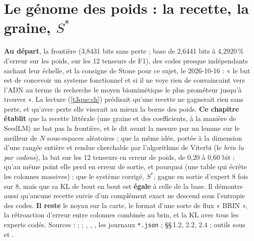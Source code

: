 \chapter{Le génome des poids : la recette, la graine, \texorpdfstring{$S^{*}$}{S*}}\label{t3gen:ch}

\begin{origine}
\textbf{Au départ}, la frontière (3,8431 bits sans perte ; base de 2,6441 bits à 4,2920\,\% d'erreur sur les poids, sur les 12 tenseurs de F1), des codes presque indépendants sachant leur échelle, et la consigne de Stone pour ce sujet, le 2026-10-16 : « le but est de concevoir un systeme fonctionnel et si il ne voye rien de convaincaint vers l'ADN au terme ils recherche le moyen biomimétique le plus prométeur jusqu'à trouver ». La lecture (\cref{t3que:ch}) prédisait qu'une recette ne gagnerait rien sans perte, et qu'avec perte elle viserait au mieux la borne des poids.
\textbf{Ce chapitre établit} que la recette littérale (une graine et des coefficients, à la manière de SeedLM) ne bat pas la frontière, et le dit avant la mesure par un lemme sur le meilleur de $N$ sous-espaces aléatoires ; que la même idée, portée à la dimension d'une rangée entière et rendue cherchable par l'algorithme de Viterbi (le \emph{brin lu par codons}), la bat sur les 12 tenseurs en erreur de poids, de 0,20 à 0,60 bit ; qu'au même point elle perd en erreur de sortie, et pourquoi (une table qui écrête les colonnes massives) ; que le système corrigé, $S^{*}$, gagne en sortie d'expert 8 fois sur 8, mais que sa KL de bout en bout est \textbf{égale} à celle de la base. Il démontre aussi qu'aucune recette suivie d'un complément exact ne descend sous l'entropie des codes.
\textbf{Il reste} le noyau sur la carte, le format d'une sorte de flux « BRIN », la rétroaction d'erreur entre colonnes combinée au brin, et la KL avec tous les experts codés.
Sources :  ;  ; , , , les journaux \texttt{*.json} ;  §§\,1.2, 2.2, 2.4 ; outils sous  et .
\end{origine}

